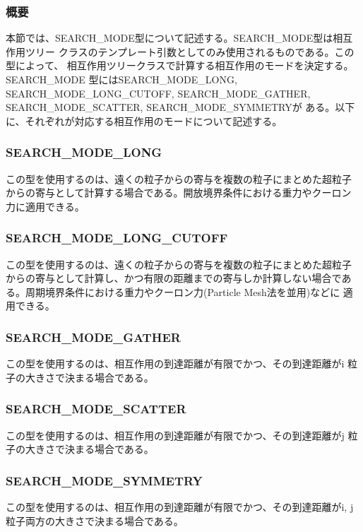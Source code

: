 \subsubsection{概要}

本節では、SEARCH\_MODE型について記述する。SEARCH\_MODE型は相互作用ツリー
クラスのテンプレート引数としてのみ使用されるものである。この型によって、
相互作用ツリークラスで計算する相互作用のモードを決定する。SEARCH\_MODE
型にはSEARCH\_MODE\_LONG, SEARCH\_MODE\_LONG\_CUTOFF,
SEARCH\_MODE\_GATHER, SEARCH\_MODE\_SCATTER, SEARCH\_MODE\_SYMMETRYが
ある。以下に、それぞれが対応する相互作用のモードについて記述する。

\subsubsection{SEARCH\_MODE\_LONG}

この型を使用するのは、遠くの粒子からの寄与を複数の粒子にまとめた超粒子
からの寄与として計算する場合である。開放境界条件における重力やクーロン
力に適用できる。

\subsubsection{SEARCH\_MODE\_LONG\_CUTOFF}

この型を使用するのは、遠くの粒子からの寄与を複数の粒子にまとめた超粒子
からの寄与として計算し、かつ有限の距離までの寄与しか計算しない場合であ
る。周期境界条件における重力やクーロン力(Particle Mesh法を並用)などに
適用できる。

\subsubsection{SEARCH\_MODE\_GATHER}

この型を使用するのは、相互作用の到達距離が有限でかつ、その到達距離がi
粒子の大きさで決まる場合である。

\subsubsection{SEARCH\_MODE\_SCATTER}

この型を使用するのは、相互作用の到達距離が有限でかつ、その到達距離がj
粒子の大きさで決まる場合である。

\subsubsection{SEARCH\_MODE\_SYMMETRY}

この型を使用するのは、相互作用の到達距離が有限でかつ、その到達距離がi,
j粒子両方の大きさで決まる場合である。

